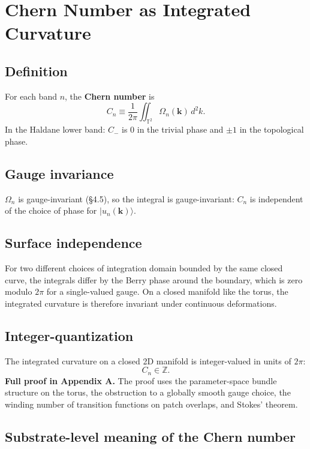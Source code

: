 \documentclass[11pt,a4paper]{article}
\begin{document}
\section{Chern Number as Integrated Curvature}

\subsection{Definition}

For each band $n$, the \textbf{Chern number} is
\[
C_n \equiv \frac{1}{2\pi}\iint_{\mathbb{T}^2}\Omega_n(\mathbf{k})\, d^2k.
\]
In the Haldane lower band: $C_-$ is $0$ in the trivial phase and $\pm 1$ in the topological phase.

\subsection{Gauge invariance}

$\Omega_n$ is gauge-invariant (\S4.5), so the integral is gauge-invariant: $C_n$ is independent of the choice of phase for $|u_n(\mathbf{k})\rangle$.

\subsection{Surface independence}

For two different choices of integration domain bounded by the same closed curve, the integrals differ by the Berry phase around the boundary, which is zero modulo $2\pi$ for a single-valued gauge. On a closed manifold like the torus, the integrated curvature is therefore invariant under continuous deformations.

\subsection{Integer-quantization}

The integrated curvature on a closed 2D manifold is integer-valued in units of $2\pi$:
\[
C_n \in \mathbb{Z}.
\]
\textbf{Full proof in Appendix A.} The proof uses the parameter-space bundle structure on the torus, the obstruction to a globally smooth gauge choice, the winding number of transition functions on patch overlaps, and Stokes' theorem.

\subsection{Substrate-level meaning of the Chern number}
\end{document}
